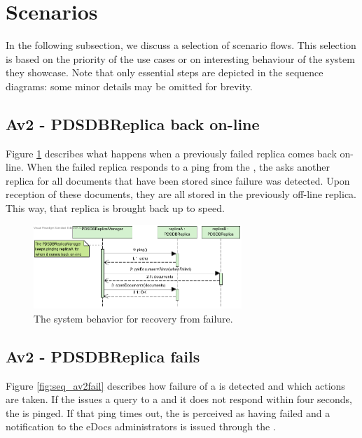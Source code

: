\section{Scenarios}\label{sec:scenarios}
In the following subsection, we discuss a selection of scenario flows. This selection is based on the priority of the use cases or on interesting behaviour of the system they showcase. Note that only essential steps are depicted in the sequence diagrams: some minor details may be omitted for brevity.

\subsection{Av2 - PDSDBReplica back on-line}
Figure \ref{fig:seq_av2online} describes what happens when a previously failed replica comes back on-line. When the failed replica responds to a ping from the , the  asks another replica for all documents that have been stored since failure was detected. Upon reception of these documents, they are all stored in the previously off-line replica. This way, that replica is brought back up to speed.

\begin{figure}[!htp]
    \centering
    \includegraphics[width=0.7\textwidth]{figures/Av2 - PDSDBReplica back on-line.png}
    \caption{The system behavior for recovery from  failure.
        }\label{fig:seq_av2online}
\end{figure}

\subsection{Av2 - PDSDBReplica fails}
Figure \ref{fig:seq_av2fail} describes how failure of a  is detected and which actions are taken. If the  issues a query to a  and it does not respond within four seconds, the  is pinged. If that ping times out, the  is perceived as having failed and a notification to the eDocs administrators is issued through the .

